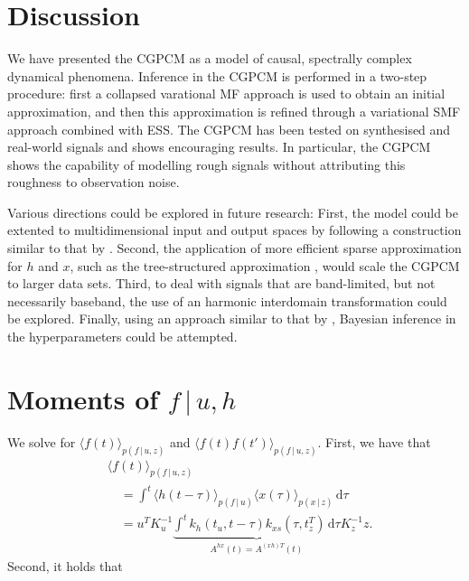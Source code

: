 \documentclass{article}
\newcommand{\id}[1]{\, \mathrm{d} #1}     %
\newcommand{\cond}{\, | \,}               %
\newcommand{\la}{\langle}
\newcommand{\ra}{\rangle}
\begin{document}
\section{Discussion}
We have presented the CGPCM as a model of causal, spectrally complex dynamical phenomena. Inference in the CGPCM is performed in a two-step procedure: first a collapsed varational MF approach is used to obtain an initial approximation, and then this approximation is refined through a variational SMF approach combined with ESS. The CGPCM has been tested on synthesised and real-world signals and shows encouraging results. In particular, the CGPCM shows the capability of modelling rough signals without attributing this roughness to observation noise.

Various directions could be explored in future research: First, the model could be extented to multidimensional input and output spaces by following a construction similar to that by \citet{Bruinsma:2016:GGPCM}. Second, the application of more efficient sparse approximation for $h$ and $x$, such as the tree-structured approximation \cite{Bui:2014:Tree-Structured_Gaussian}, would scale the CGPCM to larger data sets. Third, to deal with signals that are band-limited, but not necessarily baseband, the use of an harmonic interdomain transformation \cite{Tobar:2015:Inter-Domain_Inducing} could be explored.
Finally, using an approach similar to that by \citet{Lazaro-Gredilla:2013:Variational_Inference_for_Mahalanobis_Distance}, Bayesian inference in the hyperparameters could be attempted.

\appendix
\section{Moments of $f\cond u, h$}
\label{app:moments_f}
We solve for $\la f(t) \ra_{p(f\cond u,z)}$ and $\la f(t) f(t') \ra_{p(f\cond u,z)}$. First, we have that
\begin{align*}
    &\la f(t) \ra_{p(f\cond u,z)} \\
    &\quad= \int^t \la h(t - \tau)\ra_{p(f\cond u)} \la x(\tau) \ra_{p(x\cond z)} \id{\tau} \\
    &\quad= u^T K_u^{-1} \underbrace{\int^t k_h(t_u,t-\tau) k_{xs}(\tau, t_z^T) \id{ \tau}}_{A^{hx}(t)=A^{(xh)T}(t)} K_z^{-1} z.
\end{align*}
Second, it holds that
\end{document}
